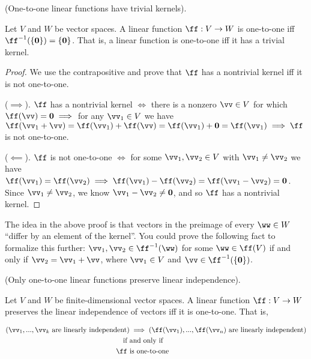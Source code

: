\begin{theorem}
\label{ch::lin_alg::thm::linear_fn_1-1_trivial_kernel}
    (One-to-one linear functions have trivial kernels). 
    
    Let $V$ and $W$ be vector spaces. A linear function $\ff:V \rightarrow W$ is one-to-one iff $\ff^{-1}(\{\mathbf{0}\}) = \{\mathbf{0}\}$. That is, a linear function is one-to-one iff it has a trivial kernel.
\end{theorem}

\begin{proof}
    We use the contrapositive and prove that $\ff$ has a nontrivial kernel iff it is not one-to-one.
    
    ($\implies$). $\ff$ has a nontrivial kernel $\iff$ there is a nonzero $\vv \in V$ for which $\ff(\vv) = \mathbf{0} \implies$ for any $\vv_1 \in V$ we have $\ff(\vv_1 + \vv) = \ff(\vv_1) + \ff(\vv) = \ff(\vv_1) + \mathbf{0} = \ff(\vv_1) \implies \ff$ is not one-to-one.
    
    ($\impliedby$). $\ff$ is not one-to-one $\iff$ for some $\vv_1, \vv_2 \in V$ with $\vv_1 \neq \vv_2$ we have $\ff(\vv_1) = \ff(\vv_2) \implies \ff(\vv_1) - \ff(\vv_2) = \ff(\vv_1 - \vv_2) = \mathbf{0}$. Since $\vv_1 \neq \vv_2$, we know $\vv_1 - \vv_2 \neq \mathbf{0}$, and so $\ff$ has a nontrivial kernel.
\end{proof}

\begin{remark}
    The idea in the above proof is that vectors in the preimage of every $\ww \in W$ ``differ by an element of the kernel''. You could prove the following fact to formalize this further: $\vv_1, \vv_2 \in \ff^{-1}(\ww)$ for some $\ww \in \ff(V)$ if and only if $\vv_2 = \vv_1 + \vv$, where $\vv_1 \in V$ and $\vv \in \ff^{-1}(\{\mathbf{0}\})$.
\end{remark}

\begin{theorem}
\label{ch::lin_alg::lemma::only_inv_fns_preserve_lin_indep}

    (Only one-to-one linear functions preserve linear independence). 
    
    Let $V$ and $W$ be finite-dimensional vector spaces. A linear function $\ff:V \rightarrow W$ preserves the linear independence of vectors iff it is one-to-one. That is, 
    
    \begin{align*}
       (\vv_1, ..., \vv_k \text{ are linearly independent}) &\implies (\ff(\vv_1), ..., \ff(\vv_n) \text{ are linearly independent})\\
        \text{if} \text{ } &\text{and only if} \\
        \ff \text{ } &\text{is one-to-one}
    \end{align*}
\end{theorem}

